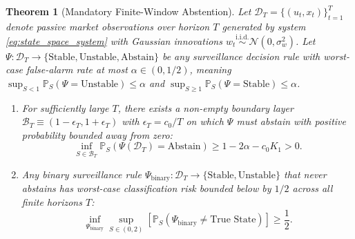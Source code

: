 \documentclass[12pt]{article}
\newtheorem{theorem}{Theorem}[section]
\theoremstyle{definition}
\theoremstyle{remark}
\begin{document}
\begin{theorem}[Mandatory Finite-Window Abstention]
\label{thm:m3_minimax_abstention}
Let $\mathcal{D}_T = \{(u_t, x_t)\}_{t=1}^T$ denote passive market observations over horizon $T$ generated by system \eqref{eq:state_space_system} with Gaussian innovations $w_t \stackrel{\text{i.i.d.}}{\sim} \mathcal{N}(0, \sigma_w^2)$. Let $\Psi: \mathcal{D}_T \to \{\text{Stable}, \text{Unstable}, \text{Abstain}\}$ be any surveillance decision rule with worst-case false-alarm rate at most $\alpha \in (0, 1/2)$, meaning $\sup_{S < 1} \mathbb{P}_S(\Psi = \text{Unstable}) \le \alpha$ and $\sup_{S \ge 1} \mathbb{P}_S(\Psi = \text{Stable}) \le \alpha$.
\begin{enumerate}
    \item For sufficiently large $T$, there exists a non-empty boundary layer $\mathcal{B}_T \equiv (1 - \epsilon_T, 1 + \epsilon_T)$ with $\epsilon_T = c_0 / T$ on which $\Psi$ must abstain with positive probability bounded away from zero:
    \begin{equation}
    \inf_{S \in \mathcal{B}_T} \mathbb{P}_S\left(\Psi(\mathcal{D}_T) = \text{Abstain}\right) \ge 1 - 2\alpha - c_0 K_1 > 0.
    \label{eq:abstain_bound}
    \end{equation}
    \item Any binary surveillance rule $\Psi_{\text{binary}}: \mathcal{D}_T \to \{\text{Stable}, \text{Unstable}\}$ that never abstains has worst-case classification risk bounded below by $1/2$ across all finite horizons $T$:
    \begin{equation}
    \inf_{\Psi_{\text{binary}}} \sup_{S \in (0, 2)} \left[ \mathbb{P}_S(\Psi_{\text{binary}} \neq \text{True State}) \right] \ge \frac{1}{2}.
    \end{equation}
\end{enumerate}
\end{theorem}
\end{document}
